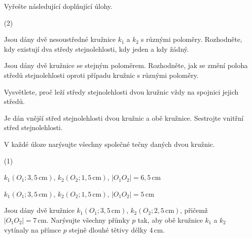 \documentclass[12pt,a4paper]{article}
\begin{document}

\begin{exercise}

    Vyřešte následující doplňující úlohy.

    \begin{tasks}(2)

        \task Jsou dány dvě nesoustředné kružnice $k_1$ a $k_2$ s různými poloměry. Rozhodněte, kdy existují dva středy stejnolehlosti, kdy jeden a kdy žádný.

        \task Jsou dány dvě kružnice se stejným poloměrem. Rozhodněte, jak se změní poloha středů stejnolehlosti oproti případu kružnic s různými poloměry.

        \task Vysvětlete, proč leží středy stejnolehlosti dvou kružnic vždy na spojnici jejich středů.

        \task Je dán vnější střed stejnolehlosti dvou kružnic a obě kružnice. Sestrojte vnitřní střed stejnolehlosti.

    \end{tasks}

\end{exercise}



\setcounter{section}{4}

\begin{exercise}

    V každé úloze narýsujte všechny společné tečny daných dvou kružnic.

    \begin{tasks}(1)

        \task $k_1(O_1;3{,}5\,\mathrm{cm})$, $k_2(O_2;1{,}5\,\mathrm{cm})$, $|O_1O_2|=6{,}5\,\mathrm{cm}$

        \task $k_1(O_1;3{,}5\,\mathrm{cm})$, $k_2(O_2;1{,}5\,\mathrm{cm})$, $|O_1O_2|=5\,\mathrm{cm}$

    \end{tasks}

\end{exercise}



\begin{exercise}

    Jsou dány dvě kružnice $k_1(O_1;3{,}5\,\mathrm{cm})$, $k_2(O_2;2{,}5\,\mathrm{cm})$, přičemž $|O_1O_2|=7\,\mathrm{cm}$.
    Narýsujte všechny přímky $p$ tak, aby obě kružnice $k_1$ a $k_2$ vytínaly na přímce $p$ stejně dlouhé tětivy délky $4\,\mathrm{cm}$.

\end{exercise}
\end{document}
